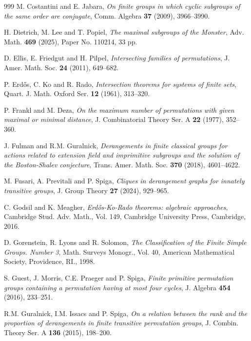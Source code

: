 \documentclass[twoside,a4paper,reqno,11pt]{amsart}
\newcommand{\<}{\langle}
\renewcommand{\>}{\rangle}
\theoremstyle{definition}
\begin{document}
\begin{thebibliography}{999}
		M. Costantini and E. Jabara, \textit{On finite groups in which cyclic subgroups of the same order are conjugate}, Comm. Algebra \textbf{37} (2009), 3966–3990.
		
		H. Dietrich, M. Lee and T. Popiel, \textit{The maximal subgroups of the Monster}, Adv. Math. \textbf{469} (2025), Paper No. 110214, 33 pp.
		
		D. Ellis, E. Friedgut and H. Pilpel, \textit{Intersecting families of permutations}, J. Amer. Math. Soc. \textbf{24} (2011), 649–682.
		
		P. Erdős, C. Ko and R. Rado, \textit{Intersection theorems for systems of finite sets}, Quart. J. Math. Oxford Ser. \textbf{12} (1961), 313–320.
		
		P. Frankl and M. Deza, \textit{On the maximum number of permutations with given maximal or minimal distance}, J. Combinatorial Theory Ser. A \textbf{22} (1977), 352–360.
		
		J. Fulman and R.M. Guralnick, \textit{Derangements in finite classical groups for actions related to extension field and imprimitive subgroups and the solution of the Boston-Shalev conjecture}, Trans. Amer. Math.
		Soc. \textbf{370} (2018), 4601–4622.
		
		M. Fusari, A. Previtali and P. Spiga, \textit{Cliques in derangement graphs for innately transitive groups}, J. Group Theory \textbf{27} (2024),  929–965.
		
		C. Godsil and K. Meagher, \textit{Erdős-Ko-Rado theorems: algebraic approaches}, Cambridge Stud. Adv. Math., Vol. 149, Cambridge University Press, Cambridge, 2016.
		
		D. Gorenstein, R. Lyons and R. Solomon, \textit{The Classification of the Finite Simple Groups. Number 3}, Math. Surveys Monogr., Vol. 40, American Mathematical Society, Providence, RI., 1998.
		
		S. Guest, J. Morris, C.E. Praeger and P. Spiga, \textit{Finite primitive permutation groups containing a permutation having at most four cycles}, J. Algebra \textbf{454} (2016), 233–251.
		
		R.M. Guralnick, I.M. Issacs and P. Spiga, \textit{On a relation between the rank and the proportion of derangements in finite transitive permutation groups}, J. Combin. Theory Ser. A \textbf{136} (2015), 198–200.
		

\end{thebibliography}
\end{document}
